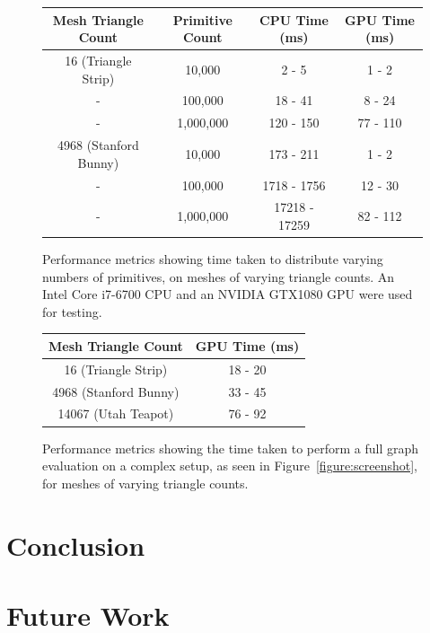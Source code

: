 \documentclass[]{acmsiggraph}
\begin{document}
\begin{figure}[htbp]\centering
\begin{center}
\begin{tabular}{||c||c|c|c||}
\hline
Mesh Triangle Count & Primitive Count & CPU Time (ms) & GPU Time (ms)\\
\hline
\hline
16 (Triangle Strip) & 10,000 & 2 - 5 & 1 - 2\\
\hline
 - & 100,000 & 18 - 41 & 8 - 24\\
\hline
 - & 1,000,000 & 120 - 150 & 77 - 110\\
\hline
4968 (Stanford Bunny) & 10,000 & 173 - 211 & 1 - 2\\
\hline
 - & 100,000 & 1718 - 1756 & 12 - 30\\
\hline
 - & 1,000,000 & 17218 - 17259 & 82 - 112\\
\hline
\end{tabular}
\caption{\label{figure:distributionPerformance} Performance metrics showing time taken to distribute varying numbers of primitives, on meshes of varying triangle counts. An Intel Core i7-6700 CPU and an NVIDIA GTX1080 GPU were used for testing.}
\end{center}
\end{figure}

\begin{figure}[htbp]\centering
\begin{center}
\begin{tabular}{||c|c||}
\hline
Mesh Triangle Count & GPU Time (ms)\\
\hline
\hline
16 (Triangle Strip) & 18 - 20\\
\hline
4968 (Stanford Bunny) & 33 - 45\\
\hline
14067 (Utah Teapot) & 76 - 92\\
\hline
\end{tabular}
\caption{\label{figure:fullPerformance} Performance metrics showing the time taken to perform a full graph evaluation on a complex setup, as seen in Figure~\ref{figure:screenshot}, for meshes of varying triangle counts.}
\end{center}
\end{figure}

\section{Conclusion} \label{sec:conclusion}

\section{Future Work} \label{sec:futurework}
\end{document}
